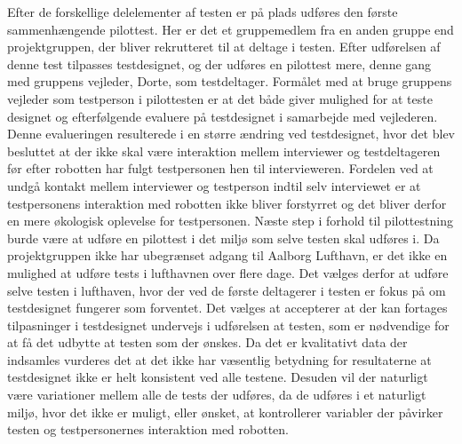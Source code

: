 Efter de forskellige delelementer af testen er på plads udføres den første sammenhængende pilottest. Her er det et gruppemedlem fra en anden gruppe end projektgruppen, der bliver rekrutteret til at deltage i testen. Efter udførelsen af denne test tilpasses testdesignet, og der udføres en pilottest mere, denne gang med gruppens vejleder, Dorte, som testdeltager. Formålet med at bruge gruppens vejleder som testperson i pilottesten er at det både giver mulighed for at teste designet og efterfølgende evaluere på testdesignet i samarbejde med vejlederen. Denne evalueringen resulterede i en større ændring ved testdesignet, hvor det blev besluttet at der ikke skal være interaktion mellem interviewer og testdeltageren før efter robotten har fulgt testpersonen hen til intervieweren. Fordelen ved at undgå kontakt mellem interviewer og testperson indtil selv interviewet er at testpersonens interaktion med robotten ikke bliver forstyrret og det bliver derfor en mere økologisk oplevelse for testpersonen. \blankline
%
Næste step i forhold til pilottestning burde være at udføre en pilottest i det miljø som selve testen skal udføres i. Da projektgruppen ikke har ubegrænset adgang til Aalborg Lufthavn, er det ikke en mulighed at udføre tests i lufthavnen over flere dage. Det vælges derfor at udføre selve testen i lufthaven, hvor der ved de første deltagerer i testen er fokus på om testdesignet fungerer som forventet. Det vælges at accepterer at der kan fortages tilpasninger i testdesignet undervejs i udførelsen at testen, som er nødvendige for at få det udbytte at testen som der ønskes. Da det er kvalitativt data der indsamles vurderes det at det ikke har væsentlig betydning for resultaterne at testdesignet ikke er helt konsistent ved alle testene. Desuden vil der naturligt være variationer mellem alle de tests der udføres, da de udføres i et naturligt miljø, hvor det ikke er muligt, eller ønsket, at kontrollerer variabler der påvirker testen og testpersonernes interaktion med robotten. 


